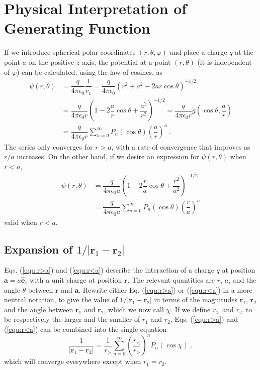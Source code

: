 \documentclass[12pt,a4paper]{article}
\renewcommand{\vec}[1]{\boldsymbol{#1}}
\begin{document}
\section{Physical Interpretation of Generating Function}
\cite{arfken} If we introduce spherical polar coordinates $(r, \theta, \varphi)$ and place a charge $q$ at the point $a$ on the positive $z$ axis, the potential at a point $(r, \theta)$ (it is independent of $\varphi$) can be calculated, using the law of cosines, as
\begin{align}
\nonumber \psi(r, \theta) &= \dfrac{q}{4\pi \epsilon_0} \dfrac{1}{r_1} = \dfrac{q}{4\pi \epsilon_0} (r^2 +a^2 -2ar \cos \theta)^{-1/2} \\
\nonumber &= \dfrac{q}{4\pi \epsilon_0 r} \left(1 -2\dfrac{a}{r} \cos \theta +\dfrac{a^2}{r^2} \right)^{-1/2} = \dfrac{q}{4\pi \epsilon_0 r} g\left(\cos \theta, \dfrac{a}{r}\right) \\
&= \dfrac{q}{4\pi \epsilon_0 r} \sum_{n=0}^\infty P_n(\cos \theta) \left(\dfrac{a}{r} \right)^n ~.
\label{equ:r>a}
\end{align}
The series only converges for $r > a$, with a rate of convergence that improves as $r/a$ increases. On the other hand, if we desire an expression for $\psi(r, \theta)$ when $r < a$,
\begin{align}
\nonumber \psi(r, \theta) &= \dfrac{q}{4\pi \epsilon_0 a} \left(1 -2\dfrac{r}{a} \cos \theta +\dfrac{r^2}{a^2} \right)^{-1/2} \\
&= \dfrac{q}{4\pi \epsilon_0 a} \sum_{n=0}^\infty P_n(\cos \theta) \left(\dfrac{r}{a} \right)^n
\label{equ:r<a}
\end{align}
valid when $r < a$. 

\subsection{Expansion of $1/|\vec{r}_1 - \vec{r}_2|$}
Eqs. (\ref{equ:r>a}) and (\ref{equ:r<a}) describe the interaction of a charge $q$ at position $\vec{a} = a \vec{\hat{e}}_z$ with a unit charge at position $\vec{r}$. The relevant quantities are $r$, $a$, and the angle $\theta$ between $\vec{r}$ and $\vec{a}$. Rewrite either Eq. (\ref{equ:r>a}) or (\ref{equ:r<a}) in a more neutral notation, to give the value of $1/|\vec{r}_1 - \vec{r}_2|$ in terms of the magnitudes $\vec{r}_1$, $\vec{r}_2$ and the angle between $\vec{r}_1$ and $\vec{r}_2$, which we now call $\chi$. If we define $r_>$ and $r_<$ to be respectively the larger and the smaller of $r_1$ and $r_2$, Eqs. (\ref{equ:r>a}) and (\ref{equ:r<a}) can be combined into the single equation
\begin{equation}
\dfrac{1}{|\vec{r}_1 - \vec{r}_2|} = \dfrac{1}{r_>} \sum_{n=0}^\infty \left(\dfrac{r_<}{r_>}\right)^n P_n(\cos \chi) ~,
\end{equation}
which will converge everywhere except when $r_1 = r_2$.
\end{document}
